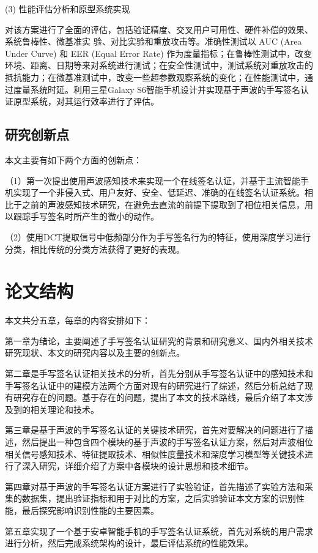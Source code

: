 (3) 性能评估分析和原型系统实现

对该方案进行了全面的评估，包括验证精度、交叉用户可用性、硬件补偿的效果、系统鲁棒性、微基准实
验、对比实验和重放攻击等。准确性测试以 AUC (Area Under Curve) 和 EER (Equal Error Rate) 作为度量指标；在鲁棒性测试中，改变环境、距离、日期等来对系统进行测试；在安全性测试中，测试系统对重放攻击的抵抗能力；在微基准测试中，改变一些超参数观察系统的变化；在性能测试中，通过度量系统时延。利用三星Galaxy S6智能手机设计并实现基于声波的手写签名认证原型系统，对其运行效率进行了评估。


\subsection{研究创新点}

本文主要有如下两个方面的创新点：

（1）第一次提出使用声波感知技术来实现一个在线签名认证，并基于主流智能手机实现了一个非侵入式、用户友好、安全、低延迟、准确的在线签名认证系统。相比于之前的声波感知技术研究，在避免去直流的前提下提取到了相位相关信息，用以跟踪手写签名时所产生的微小的动作。

（2）使用DCT提取信号中低频部分作为手写签名行为的特征，使用深度学习进行分类，相比传统的分类方法获得了更好的表现。

\section{论文结构}

本文共分五章，每章的内容安排如下：

第一章为绪论，主要阐述了手写签名认证研究的背景和研究意义、国内外相关技术研究现状、本文的研究内容以及主要的创新点。

第二章是手写签名认证相关技术的分析，首先分别从手写签名认证中的感知技术和手写签名认证中的建模方法两个方面对现有的研究进行了综述，然后分析总结了现有研究存在的问题。基于存在的问题，提出了本文的技术路线，最后介绍了本文涉及到的相关理论和技术。

第三章是基于声波的手写签名认证的关键技术研究，首先对要解决的问题进行了描述，然后提出一种包含四个模块的基于声波的手写签名认证方案，然后对声波相位相关信号感知技术、特征提取技术、相似性度量技术和深度学习模型等关键技术进行了深入研究，详细介绍了方案中各模块的设计思想和技术细节。

第四章对基于声波的手写签名认证方案进行了实验验证，首先描述了实验方法和采集的数据集，提出验证指标和用于对比的方案，之后实验验证本文方案的识别性能，最后探究影响识别性能的主要因素。

第五章实现了一个基于安卓智能手机的手写签名认证系统，首先对系统的用户需求进行分析，然后完成系统架构的设计，最后评估系统的性能效果。

